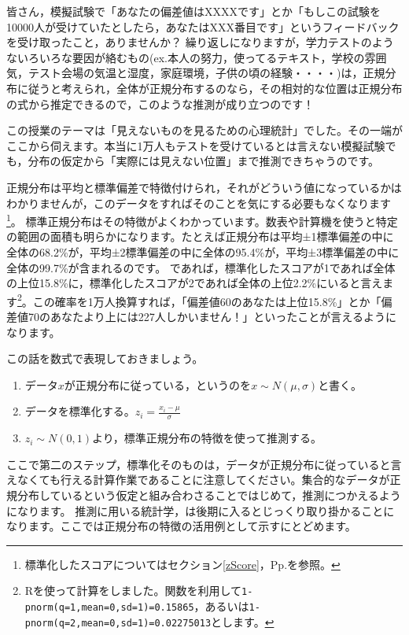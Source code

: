 \documentclass{ltjbook}
\begin{document}
皆さん，模擬試験で「あなたの偏差値はXXXXです」とか「もしこの試験を10000人が受けていたとしたら，あなたはXXX番目です」というフィードバックを受け取ったこと，ありませんか？
繰り返しになりますが，学力テストのようないろいろな要因が絡むもの(ex.本人の努力，使ってるテキスト，学校の雰囲気，テスト会場の気温と湿度，家庭環境，子供の頃の経験・・・・)は，正規分布に従うと考えられ，全体が正規分布するのなら，その相対的な位置は正規分布の式から推定できるので，このような推測が成り立つのです！

この授業のテーマは「見えないものを見るための心理統計」でした。その一端がここから伺えます。本当に1万人もテストを受けているとは言えない模擬試験でも，分布の仮定から「実際には見えない位置」まで推測できちゃうのです。

正規分布は平均と標準偏差で特徴付けられ，それがどういう値になっているかはわかりませんが，このデータをすればそのことを気にする必要もなくなります\footnote{標準化したスコアについてはセクション\ref{zScore}，Pp.\pageref{zScore}を参照。}。
標準正規分布はその特徴がよくわかっています。数表や計算機を使うと特定の範囲の面積も明らかになります。たとえば正規分布は平均±1標準偏差の中に全体の68.2\%が，平均±2標準偏差の中に全体の95.4\%が，平均±3標準偏差の中に全体の99.7\%が含まれるのです。
であれば，標準化したスコアが1であれば全体の上位15.8\%に，標準化したスコアが2であれば全体の上位2.2\%にいると言えます\footnote{Rを使って計算をしました。関数を利用して\texttt{1-pnorm(q=1,mean=0,sd=1)=0.15865}，あるいは\texttt{1-pnorm(q=2,mean=0,sd=1)=0.02275013}とします。}。この確率を1万人換算すれば，「偏差値60のあなたは上位15.8\%」とか「偏差値70のあなたより上には227人しかいません！」といったことが言えるようになります。

この話を数式で表現しておきましょう。
\begin{enumerate}
	\item データ$x$が正規分布に従っている，というのを$x \sim N(\mu,\sigma)$と書く。
	\item データを標準化する。$z_i = \frac{x_i - \mu}{\sigma} $
	\item $z_i \sim N(0,1)$より，標準正規分布の特徴を使って推測する。
\end{enumerate}

ここで第二のステップ，標準化そのものは，データが正規分布に従っていると言えなくても行える計算作業であることに注意してください。集合的なデータが正規分布しているという仮定と組み合わさることではじめて，推測につかえるようになります。
推測に用いる統計学，は後期に入るとじっくり取り掛かることになります。ここでは正規分布の特徴の活用例として示すにとどめます。
\end{document}
